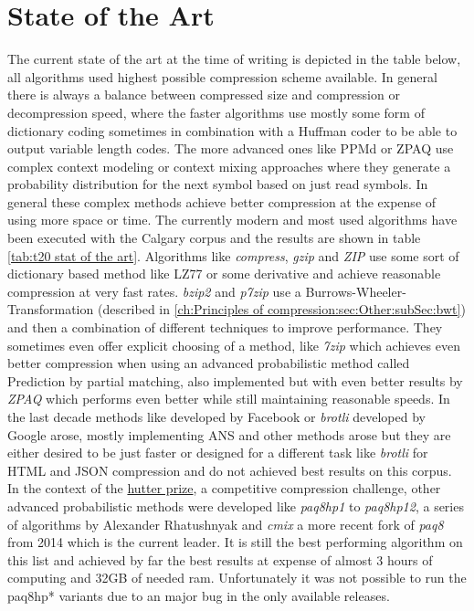 \section{State of the Art}
\label{ch:Principles of compression:sec:SOTA}
\par{
The current state of the art at the time of writing is depicted in the table below, all algorithms used highest possible compression scheme available. In general there is always a balance between compressed size and compression or decompression speed, where the faster algorithms use mostly some form of dictionary coding sometimes in combination with a Huffman coder to be able to output variable length codes. The more advanced ones like PPMd or ZPAQ use complex context modeling or context mixing approaches where they generate a probability distribution for the next symbol based on just read symbols. In general these complex methods achieve better compression at the expense of using more space or time. The currently modern and most used algorithms have been executed with the Calgary corpus and the results are shown in table \ref{tab:t20 stat of the art}. Algorithms like \textit{compress}, \textit{gzip} and \textit{ZIP} use some sort of dictionary based method like LZ77 or some derivative and achieve reasonable compression at very fast rates. \textit{bzip2} and \textit{p7zip} use a Burrows-Wheeler-Transformation (described in \ref{ch:Principles of compression:sec:Other:subSec:bwt}) and then a combination of different techniques to improve performance. They sometimes even offer explicit choosing of a method, like \textit{7zip} which achieves even better compression when using an advanced probabilistic method called Prediction by partial matching, also implemented but with even better results by \textit{ZPAQ} which performs even better while still maintaining reasonable speeds. In the last decade methods like  developed by Facebook or \textit{brotli} developed by Google arose, mostly implementing ANS and other methods arose but they are either desired to be just faster or designed for a different task like \textit{brotli} for HTML and JSON compression and do not achieved best results on this corpus. In the context of the \href{http://prize.hutter1.net/}{hutter prize}, a competitive compression challenge, other advanced probabilistic methods were developed like \textit{paq8hp1} to \textit{paq8hp12}, a series of algorithms by Alexander Rhatushnyak \cite{mahoney2011large} and \textit{cmix} a more recent fork of \textit{paq8} from 2014 which is the current leader. It is still the best performing algorithm on this list and achieved by far the best results at expense of almost 3 hours of computing and 32GB of needed ram. Unfortunately it was not possible to run the paq8hp* variants due to an major bug in the only available releases.
}

